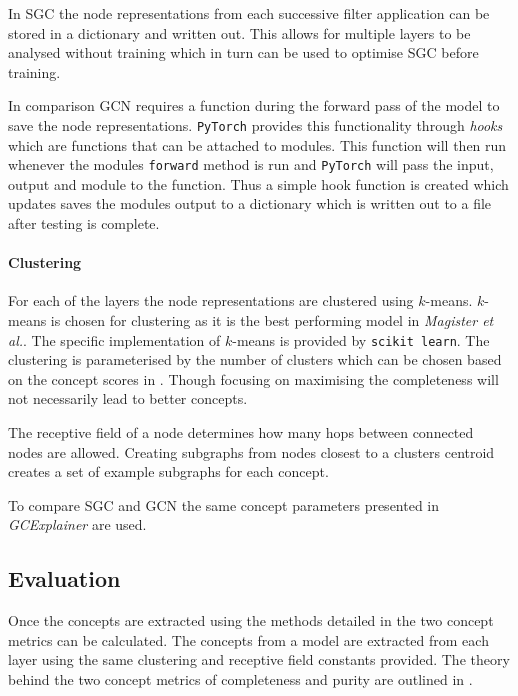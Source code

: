 In SGC the node representations from each successive filter application can be stored in a dictionary and written out.
This allows for multiple layers to be analysed without training which in turn can be used to optimise SGC before training.

In comparison GCN requires a function during the forward pass of the model to save the node representations.
\texttt{PyTorch}\cite{paszke2019pytorch} provides this functionality through \emph{hooks} which are functions that can be attached to modules.
This function will then run whenever the modules \texttt{forward} method is run and \texttt{PyTorch} will pass the input, output and module to the function.
Thus a simple hook function is created which updates saves the modules output to a dictionary which is written out to a file after testing is complete.

\paragraph{Clustering}
For each of the layers the node representations are clustered using $k$-means.
$k$-means is chosen for clustering as it is the best performing model in \textit{Magister et al.}\cite{magister2021gcexplainer}.
The specific implementation of $k$-means is provided by
\texttt{scikit learn}\cite{scikit-learn}.
The clustering is parameterised by the number of clusters which
can be chosen based on the concept scores in .
Though focusing on maximising the completeness will not necessarily lead to better concepts.

The receptive field of a node determines how many hops between connected nodes are allowed.
Creating subgraphs from nodes closest to a clusters centroid creates a set of example subgraphs for each concept.

To compare SGC and GCN the same concept parameters presented in \textit{GCExplainer}\cite{magister2021gcexplainer} are used.

\subsection{Evaluation}
\label{sec:concept-eval}

Once the concepts are extracted using the methods detailed in  the two concept metrics can be calculated.
The concepts from a model are extracted from each layer using the same clustering and receptive field constants provided.
The theory behind the two concept metrics of completeness and purity are outlined in .

